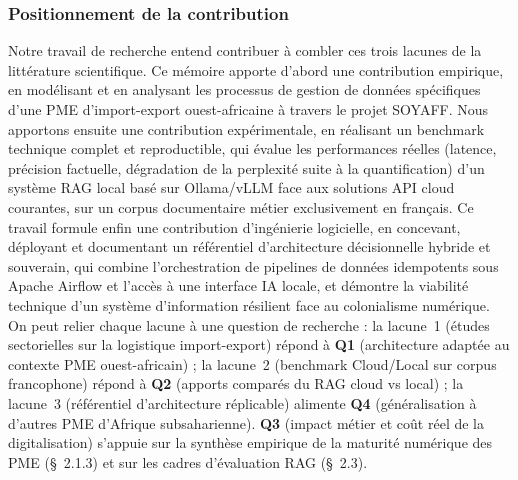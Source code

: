 \subsubsection{Positionnement de la contribution}

Notre travail de recherche entend contribuer à combler ces trois lacunes de la littérature scientifique. Ce mémoire apporte d'abord une contribution empirique, en modélisant et en analysant les processus de gestion de données spécifiques d'une PME d'import-export ouest-africaine à travers le projet SOYAFF. Nous apportons ensuite une contribution expérimentale, en réalisant un benchmark technique complet et reproductible, qui évalue les performances réelles (latence, précision factuelle, dégradation de la perplexité suite à la quantification) d'un système RAG local basé sur Ollama/vLLM face aux solutions API cloud courantes, sur un corpus documentaire métier exclusivement en français. Ce travail formule enfin une contribution d'ingénierie logicielle, en concevant, déployant et documentant un référentiel d'architecture décisionnelle hybride et souverain, qui combine l'orchestration de pipelines de données idempotents sous Apache Airflow et l'accès à une interface IA locale, et démontre la viabilité technique d'un système d'information résilient face au colonialisme numérique.
On peut relier chaque lacune à une question de recherche : la lacune~1 (études sectorielles sur la logistique import-export) répond à \textbf{Q1} (architecture adaptée au contexte PME ouest-africain) ; la lacune~2 (benchmark Cloud/Local sur corpus francophone) répond à \textbf{Q2} (apports comparés du RAG cloud vs local) ; la lacune~3 (référentiel d'architecture réplicable) alimente \textbf{Q4} (généralisation à d'autres PME d'Afrique subsaharienne). \textbf{Q3} (impact métier et coût réel de la digitalisation) s'appuie sur la synthèse empirique de la maturité numérique des PME (\S~2.1.3) et sur les cadres d'évaluation RAG (\S~2.3).
